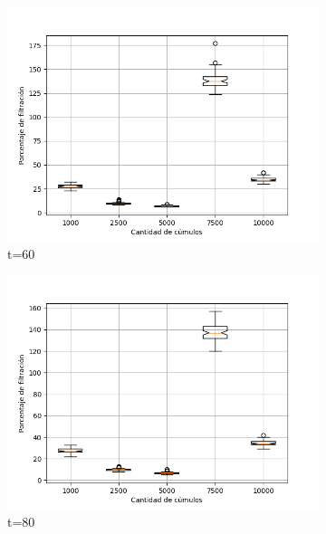 \documentclass{article}
\begin{document}
\begin{figure}
\begin{subfigure}[b]{0.49\linewidth}
            \includegraphics[width=\linewidth]{tareaocho60.png}
            \caption{t=60}
            \label{fig:westminster_aerea}
        \end{subfigure}
        \begin{subfigure}[b]{0.49\linewidth}
            \includegraphics[width=\linewidth]{tareaocho80.png}
            \caption{t=80}
            \label{fig:westminster_aerea}
        \end{subfigure}
        \begin{subfigure}[b]{0.49\linewidth}

\end{subfigure}
\end{figure}
\end{document}
